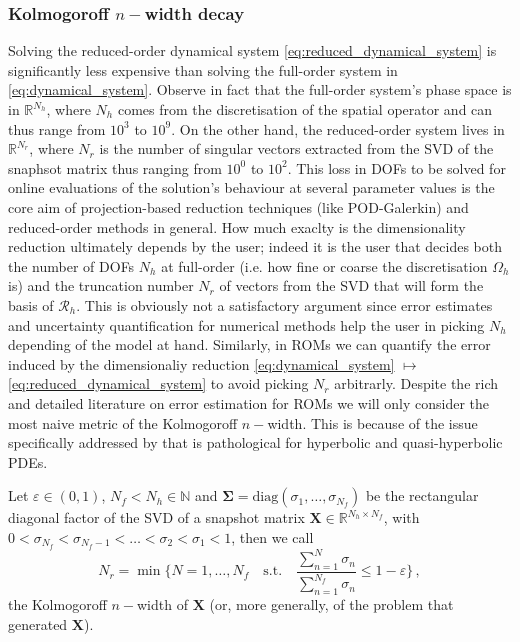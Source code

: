\documentclass[../main.tex]{subfiles}
\begin{document}
\subsubsection{Kolmogoroff $n-$width decay}\label{subsubsec:kol_decay}

Solving the reduced-order dynamical system \eqref{eq:reduced_dynamical_system} is significantly less expensive than solving the full-order system in \eqref{eq:dynamical_system}.
Observe in fact that the full-order system's phase space is in $\mathbb{R}^{N_{h}}$, where $N_{h}$ comes from the discretisation of the spatial operator and can thus range from $10^{3}$ to $10^{9}$. 
On the other hand, the reduced-order system lives in $\mathbb{R}^{N_{r}}$, where $N_{r}$ is the number of singular vectors extracted from the SVD of the snaphsot matrix thus ranging from $10^{0}$ to $10^{2}$.
This loss in DOFs to be solved for online evaluations of the solution's behaviour at several parameter values is the core aim of projection-based reduction techniques (like POD-Galerkin) and reduced-order methods in general.
How much exaclty is the dimensionality reduction ultimately depends by the user; indeed it is the user that decides both the number of DOFs $N_{h}$ at full-order (i.e. how fine or coarse the discretisation $\Omega_{h}$ is) and the truncation number $N_{r}$ of vectors from the SVD that will form the basis of $\mathcal{R}_{h}$.
This is obviously not a satisfactory argument since error estimates and uncertainty quantification for numerical methods help the user in picking $N_{h}$ depending of the model at hand.
Similarly, in ROMs we can quantify the error induced by the dimensionaliy reduction \eqref{eq:dynamical_system} $\mapsto$ \eqref{eq:reduced_dynamical_system} to avoid picking $N_{r}$ arbitrarly.
Despite the rich and detailed literature on error estimation for ROMs we will only consider the most naive metric of the Kolmogoroff $n-$width.
This is because of the issue specifically addressed by \cite{Papapicco22} that is pathological for hyperbolic and quasi-hyperbolic PDEs.

\begin{definition}\label{def:kolmogoroff_n_width}
        Let $\varepsilon\in(0,1)$, $N_{f}<N_{h}\in \mathbb{N}$ and $\boldsymbol{\Sigma}=\text{diag}(\sigma_{1},\dots,\sigma_{N_{f}})$ be the rectangular diagonal factor of the SVD of a snapshot matrix $\boldsymbol{X}\in\mathbb{R}^{N_{h}\times N_{f}}$, with $0<\sigma_{N_{f}}<\sigma_{N_{f}-1}<\dots<\sigma_{2}<\sigma_{1}<1$, then we call
        \begin{equation*}
                N_{r} = \min\Bigg\{N=1,\dots,N_{f}\quad\text{s.t.}\quad\frac{\sum_{n=1}^{N}\sigma_{n}}{\sum_{n=1}^{N_{f}}\sigma_{n}}\leq 1 - \varepsilon\Bigg\}\,,
        \end{equation*}
        the Kolmogoroff $n-$width of $\boldsymbol{X}$ (or, more generally, of the problem that generated $\boldsymbol{X}$).
\end{definition}
\end{document}
